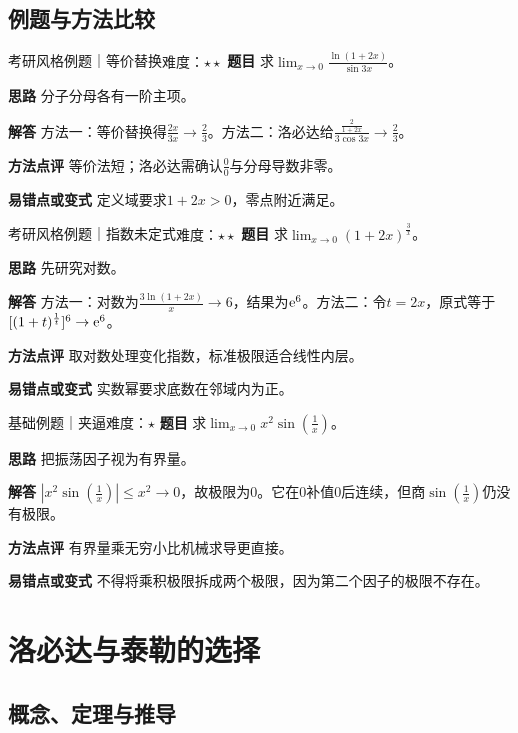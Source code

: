 \subsection{例题与方法比较}
\begin{example}{考研风格例题｜等价替换}{难度：$\star\star$}
\label{ex:1:4}\textbf{题目} 求$\lim_{x\to0}\frac{\ln(1+2x)}{\sin3x}$。\par
\textbf{思路} 分子分母各有一阶主项。\par
\textbf{解答} 方法一：等价替换得$\frac{2x}{3x}\to\frac{2}{3}$。方法二：洛必达给$\frac{\frac{2}{1+2x}}{3\cos3x}\to\frac{2}{3}$。\par
\textbf{方法点评} 等价法短；洛必达需确认$\frac{0}{0}$与分母导数非零。\par
\textbf{易错点或变式} 定义域要求$1+2x>0$，零点附近满足。
\end{example}
\begin{example}{考研风格例题｜指数未定式}{难度：$\star\star$}
\label{ex:1:5}\textbf{题目} 求$\lim_{x\to0}(1+2x)^{\frac{3}{x}}$。\par
\textbf{思路} 先研究对数。\par
\textbf{解答} 方法一：对数为$\frac{3\ln(1+2x)}{x}\to6$，结果为$\mathrm{e}^6$。方法二：令$t=2x$，原式等于$[(1+t)^{\frac{1}{t}}]^6\to\mathrm{e}^6$。\par
\textbf{方法点评} 取对数处理变化指数，标准极限适合线性内层。\par
\textbf{易错点或变式} 实数幂要求底数在邻域内为正。
\end{example}
\begin{example}{基础例题｜夹逼}{难度：$\star$}
\label{ex:1:6}\textbf{题目} 求$\lim_{x\to0}x^2\sin(\frac{1}{x})$。\par
\textbf{思路} 把振荡因子视为有界量。\par
\textbf{解答} $|x^2\sin(\frac{1}{x})|\le x^2\to0$，故极限为0。它在0补值0后连续，但商$\sin(\frac{1}{x})$仍没有极限。\par
\textbf{方法点评} 有界量乘无穷小比机械求导更直接。\par
\textbf{易错点或变式} 不得将乘积极限拆成两个极限，因为第二个因子的极限不存在。
\end{example}
\section{洛必达与泰勒的选择}\label{sec:1:3}
\subsection{概念、定理与推导}

